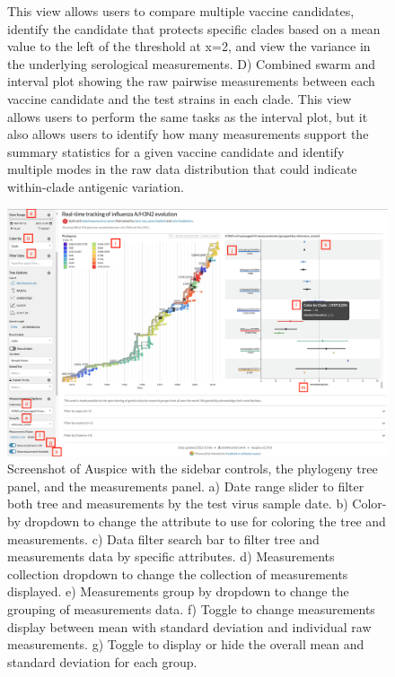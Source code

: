 \documentclass[utf8]{FrontiersinHarvard} %
\begin{document}
\begin{figure}[h!]
{This view allows users to compare multiple vaccine candidates, identify the candidate that protects specific clades based on a mean value to the left of the threshold at x=2, and view the variance in the underlying serological measurements.
D) Combined swarm and interval plot showing the raw pairwise measurements between each vaccine candidate and the test strains in each clade.
This view allows users to perform the same tasks as the interval plot, but it also allows users to identify how many measurements support the summary statistics for a given vaccine candidate and identify multiple modes in the raw data distribution that could indicate within-clade antigenic variation.
}\label{fig:1}
\end{figure}

\begin{figure}[h!]
  \begin{center}
    \includegraphics[width=\textwidth]{figures/figure-2-screen-shot}
  \end{center}
  \caption{
    Screenshot of Auspice with the sidebar controls, the phylogeny tree panel, and the measurements panel.
a) Date range slider to filter both tree and measurements by the test virus sample date.
b) Color-by dropdown to change the attribute to use for coloring the tree and measurements.
c) Data filter search bar to filter tree and measurements data by specific attributes.
d) Measurements collection dropdown to change the collection of measurements displayed.
e) Measurements group by dropdown to change the grouping of measurements data.
f) Toggle to change measurements display between mean with standard deviation and individual raw measurements.
g) Toggle to display or hide the overall mean and standard deviation for each group.
}
\end{figure}
\end{document}

